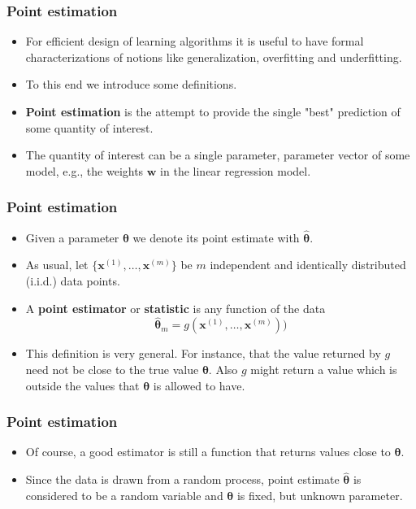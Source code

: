 \documentclass[notes]{beamer}          %
\newcommand{\vect}[1]{\bm{#1}}
\newif\iffull
\begin{document}
\begin{frame}
\frametitle{Point estimation}
    \begin{itemize}
        \item For efficient design of learning algorithms it is useful to have formal characterizations of notions like generalization, overfitting and underfitting.
        \item To this end we introduce some definitions.
        \item {\bf Point estimation} is the attempt to provide the single "best" prediction of some quantity of interest.
        \item The quantity of interest can be a single parameter, parameter vector of some model, e.g., the weights $\vect{w}$ in the linear regression model.
        \iffull
        \item It can also be a whole function, e.g., the linear function or polynomial of some degree, like in the polynomial regression.
        \fi
    \end{itemize}
\end{frame}


\begin{frame}
\frametitle{Point estimation}
    \begin{itemize}
        \item Given a parameter $\vect{\theta}$ we denote its point estimate with ${\vect{\hat{\theta}}}$.
        \item As usual, let $\{\vect{x}^{(1)}, \ldots, \vect{x}^{(m)} \}$ be $m$ independent and identically distributed (i.i.d.) data points.
        \item A {\bf point estimator} or {\bf statistic} is any function of the data
        $$
        \hat{\vect{\theta}}_m = g(\vect{x}^{(1)}, \ldots, \vect{x}^{(m)}))
        $$
        \item This definition is very general. For instance, that the value returned by $g$ need not be close to the true value $\vect{\theta}$. Also $g$ might return a value which is outside the values that $\vect{\theta}$ is allowed to have.

    \end{itemize}
\end{frame}


\begin{frame}
\frametitle{Point estimation}
    \begin{itemize}
     \item Of course, a good estimator is still a function that returns values close to $\vect{\theta}$.
    \item Since the data is drawn from a random process, point estimate $\vect{\hat\theta}$ is considered to be a random variable and $\vect{\theta}$ is fixed, but unknown parameter.
    \end{itemize}
\end{frame}
\end{document}
